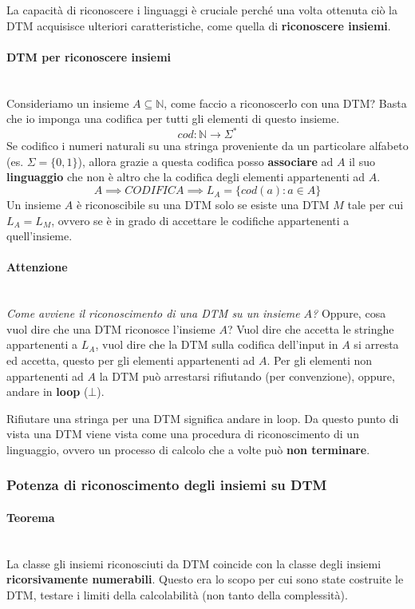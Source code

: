 \documentclass{article}
\begin{document}
La capacità di riconoscere i linguaggi è cruciale perché una volta ottenuta ciò la DTM
acquisisce ulteriori caratteristiche, come quella di \textbf{riconoscere insiemi}.

\paragraph{DTM per riconoscere insiemi}\mbox{}\\
Consideriamo un insieme $A\subseteq\mathbb{N}$, come faccio a riconoscerlo con una DTM?
Basta che io imponga una codifica per tutti gli elementi di questo insieme.
$$cod:\mathbb{N}\rightarrow\Sigma^*$$
Se codifico i numeri naturali su una
stringa proveniente da un particolare alfabeto (es. $\Sigma=\{0,1\}$), allora grazie a questa codifica
posso \textbf{associare} ad $A$ il suo \textbf{linguaggio} che non è altro che la codifica degli
elementi appartenenti ad $A$.
$$A\implies CODIFICA\implies L_A=\{cod(a):a\in A\}$$
Un insieme $A$ è riconoscibile su una DTM solo se esiste una DTM $M$ tale per cui $L_A=L_M$, ovvero
se è in grado di accettare le codifiche appartenenti a quell'insieme.
\paragraph{Attenzione}\mbox{}\\
\textit{Come avviene il riconoscimento di una DTM su un insieme $A$?} Oppure,
cosa vuol dire che una DTM riconosce l'insieme $A$?
Vuol dire che accetta le stringhe appartenenti a $L_A$, vuol dire che la DTM sulla
codifica dell'input in $A$ si arresta ed accetta, questo per gli elementi appartenenti ad $A$.
Per gli elementi non appartenenti ad $A$ la DTM può arrestarsi rifiutando (per convenzione),
oppure, andare in \textbf{loop} ($\bot$).

Rifiutare una stringa per una DTM significa andare in loop. Da questo punto di vista una DTM
viene vista come una procedura di riconoscimento di un linguaggio, ovvero un processo
di calcolo che a volte può \textbf{non terminare}.

\subsubsection{Potenza di riconoscimento degli insiemi su DTM}
\paragraph{Teorema}\mbox{}\\
La classe gli insiemi riconosciuti da DTM coincide con la classe degli insiemi
\textbf{ricorsivamente numerabili}. Questo era lo scopo per cui sono state costruite
le DTM, testare i limiti della calcolabilità (non tanto della complessità).
\end{document}
